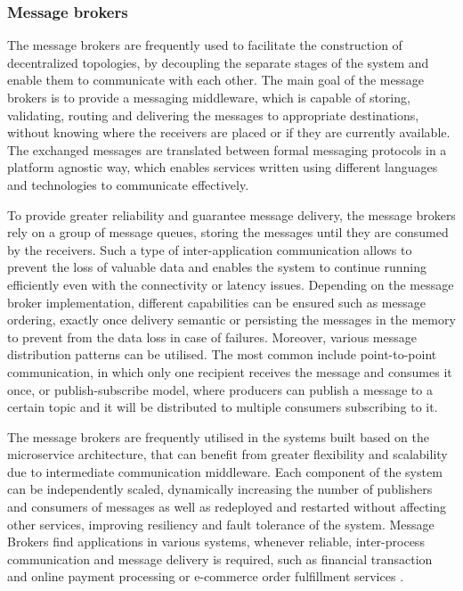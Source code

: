 \subsubsection{Message brokers}

The message brokers are frequently used to facilitate the construction of decentralized topologies, by decoupling the separate stages of the system and enable them to communicate with each other. The main goal of the message brokers is to provide a messaging middleware, which is capable of storing, validating, routing and delivering the messages to appropriate destinations, without knowing where the receivers are placed or if they are currently available. The exchanged messages are translated between formal messaging protocols in a platform agnostic way, which enables services written using different languages and technologies to communicate effectively.

To provide greater reliability and guarantee message delivery, the message brokers rely on a group of message queues, storing the messages until they are consumed by the receivers. Such a type of inter-application communication allows to prevent the loss of valuable data and enables the system to continue running efficiently even with the connectivity or latency issues. Depending on the message broker implementation, different capabilities can be ensured such as message ordering, exactly once delivery semantic or persisting the messages in the memory to prevent from the data loss in case of failures.
Moreover, various message distribution patterns can be utilised. The most common include point-to-point communication, in which only one recipient receives the message and consumes it once, or publish-subscribe model, where producers can publish a message to a certain topic and it will be distributed to multiple consumers subscribing to it.

The message brokers are frequently utilised in the systems built based on the microservice architecture, that can benefit from greater flexibility and scalability due to intermediate communication middleware. Each component of the system can be independently scaled, dynamically increasing the number of publishers and consumers of messages as well as redeployed and restarted without affecting other services, improving resiliency and fault tolerance of the system. Message Brokers find applications in various systems, whenever reliable, inter-process communication and message delivery is required, such as financial transaction and online payment processing or e-commerce order fulfillment services \cite{MessageBrokers}.

